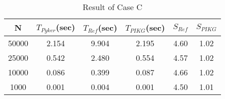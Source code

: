 \documentclass[ams]{article}
\begin{document}
		\begin{table}[htb]
                    \centering
				\caption{Result of Case C}
				\label{tb:resultC}
				\begin{tabular}{|c||c|c|c|c|c|} \hline
N & $T_{Pyker}$(sec) & $T_{Ref}$(sec) & $T_{PIKG}$(sec) &$S_{Ref}$ & $S_{PIKG}$ \\ \hline\hline
50000 &2.154 &9.904& 2.195& 4.60& 1.02\\ \hline
25000 &0.542 &2.480& 0.554& 4.57& 1.02\\ \hline
10000 &0.086 &0.399& 0.087& 4.66& 1.02\\ \hline
 1000 &0.001 &0.004& 0.001& 4.50& 1.01\\ \hline

				\end{tabular}
			\end{table}
    


       
   


		
	








\end{document}
